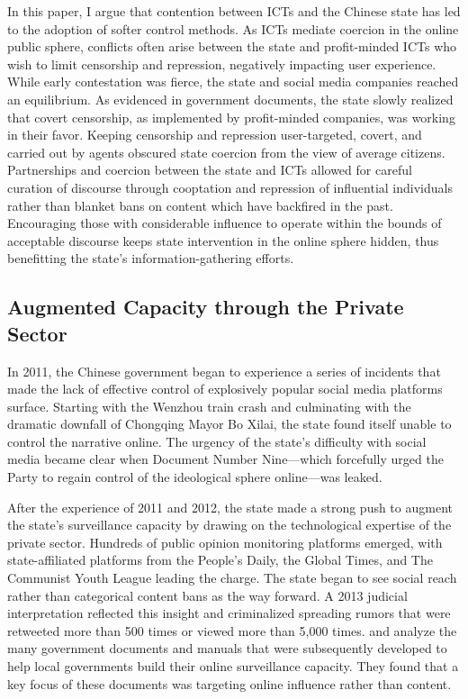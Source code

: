 \documentclass[11pt]{article}
\begin{document}
In this paper, I argue that contention between ICTs and the Chinese state has led to the adoption of softer control methods. As ICTs mediate coercion in the online public sphere, conflicts often arise between the state and profit-minded ICTs who wish to limit censorship and repression, negatively impacting user experience. While early contestation was fierce, the state and social media companies reached an equilibrium. As evidenced in government documents, the state slowly realized that covert censorship, as implemented by profit-minded companies, was working in their favor. Keeping censorship and repression user-targeted, covert, and carried out by agents obscured state coercion from the view of average citizens. Partnerships and coercion between the state and ICTs allowed for careful curation of discourse through cooptation and repression of influential individuals rather than blanket bans on content which have backfired in the past. Encouraging those with considerable influence to operate within the bounds of acceptable discourse keeps state intervention in the online sphere hidden, thus benefitting the state's information-gathering efforts.

\subsection{Augmented Capacity through the Private Sector}

In 2011, the Chinese government began to experience a series of incidents that made the lack of effective control of explosively popular social media platforms surface. Starting with the Wenzhou train crash and culminating with the dramatic downfall of Chongqing Mayor Bo Xilai, the state found itself unable to control the narrative online. The urgency of the state's difficulty with social media became clear when Document Number Nine—which forcefully urged the Party to regain control of the ideological sphere online—was leaked.

After the experience of 2011 and 2012, the state made a strong push to augment the state's surveillance capacity by drawing on the technological expertise of the private sector. Hundreds of public opinion monitoring platforms emerged, with state-affiliated platforms from the People's Daily, the Global Times, and The Communist Youth League leading the charge. The state began to see social reach rather than categorical content bans as the way forward. A 2013 judicial interpretation reflected this insight and criminalized spreading rumors that were retweeted more than 500 times or viewed more than 5,000 times. \cite{miller2022improvising} and \cite{gallagher2021not} analyze the many government documents and manuals that were subsequently developed to help local governments build their online surveillance capacity. They found that a key focus of these documents was targeting online influence rather than content.
\end{document}
